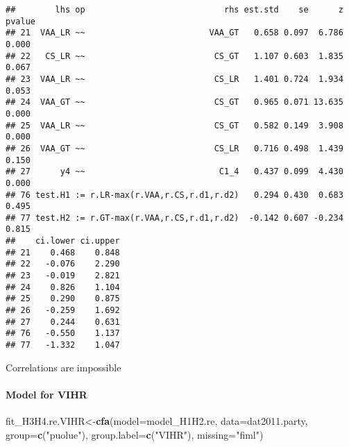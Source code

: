 \documentclass[
]{article}
\newenvironment{Shaded}{\begin{snugshade}}{\end{snugshade}}
\newcommand{\DataTypeTok}[1]{\textcolor[rgb]{0.13,0.29,0.53}{#1}}
\newcommand{\KeywordTok}[1]{\textcolor[rgb]{0.13,0.29,0.53}{\textbf{#1}}}
\newcommand{\NormalTok}[1]{#1}
\newcommand{\OperatorTok}[1]{\textcolor[rgb]{0.81,0.36,0.00}{\textbf{#1}}}
\newcommand{\StringTok}[1]{\textcolor[rgb]{0.31,0.60,0.02}{#1}}
\begin{document}
\begin{Shaded}
\end{Shaded}

\begin{verbatim}
##        lhs op                            rhs est.std    se      z pvalue
## 21  VAA_LR ~~                         VAA_GT   0.658 0.097  6.786  0.000
## 22   CS_LR ~~                          CS_GT   1.107 0.603  1.835  0.067
## 23  VAA_LR ~~                          CS_LR   1.401 0.724  1.934  0.053
## 24  VAA_GT ~~                          CS_GT   0.965 0.071 13.635  0.000
## 25  VAA_LR ~~                          CS_GT   0.582 0.149  3.908  0.000
## 26  VAA_GT ~~                          CS_LR   0.716 0.498  1.439  0.150
## 27      y4 ~~                           C1_4   0.437 0.099  4.430  0.000
## 76 test.H1 := r.LR-max(r.VAA,r.CS,r.d1,r.d2)   0.294 0.430  0.683  0.495
## 77 test.H2 := r.GT-max(r.VAA,r.CS,r.d1,r.d2)  -0.142 0.607 -0.234  0.815
##    ci.lower ci.upper
## 21    0.468    0.848
## 22   -0.076    2.290
## 23   -0.019    2.821
## 24    0.826    1.104
## 25    0.290    0.875
## 26   -0.259    1.692
## 27    0.244    0.631
## 76   -0.550    1.137
## 77   -1.332    1.047
\end{verbatim}

Correlations are impossible

\newpage

\hypertarget{model-for-vihr}{%
\paragraph{Model for VIHR}\label{model-for-vihr}}

\begin{Shaded}
\begin{Highlighting}[]
\NormalTok{fit_H3H4.re.VIHR<-}\KeywordTok{cfa}\NormalTok{(}\DataTypeTok{model=}\NormalTok{model_H1H2.re,}
                    \DataTypeTok{data=}\NormalTok{dat2011.party,}
                    \DataTypeTok{group=}\KeywordTok{c}\NormalTok{(}\StringTok{"puolue"}\NormalTok{),}
                    \DataTypeTok{group.label=}\KeywordTok{c}\NormalTok{(}\StringTok{"VIHR"}\NormalTok{),}
                    \DataTypeTok{missing=}\StringTok{"fiml"}\NormalTok{)}
\end{Highlighting}
\end{Shaded}
\end{document}
